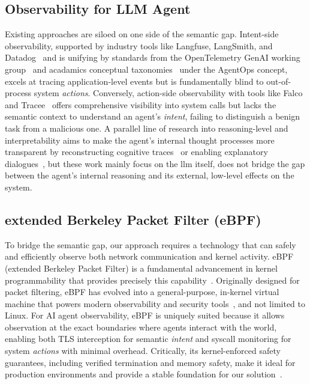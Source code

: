 \subsection{Observability for LLM Agent}

Existing approaches are siloed on one side of the semantic gap. Intent-side observability, supported by industry tools like Langfuse, LangSmith, and Datadog~\cite{Maierhofer2025Langfuse, langfuse, langsmith, Datadog2023Agents, helicone} and is unifying by standards from the OpenTelemetry GenAI working group~\cite{Liu2025OTel,Bandurchin2025Uptrace} and acadamics conceptual taxonomies~\cite{Dong2024AgentOps, Moshkovich2025Pipeline} under the AgentOps concept, excels at tracing application-level events but is fundamentally blind to out-of-process system \emph{actions}. Conversely, action-side observability with tools like Falco and Tracee~\cite{falco, tracee} offers comprehensive visibility into system calls but lacks the semantic context to understand an agent's \emph{intent}, failing to distinguish a benign task from a malicious one. A parallel line of research into reasoning-level and interpretability aims to make the agent's internal thought processes more transparent by reconstructing cognitive traces~\cite{Rombaut2025Watson} or enabling explanatory dialogues~\cite{Kim2025AgenticInterp}, but these work mainly focus on the llm itself, does not bridge the gap between the agent's internal reasoning and its external, low-level effects on the system.

\subsection{extended Berkeley Packet Filter (eBPF)}

To bridge the semantic gap, our approach requires a technology that can safely and efficiently observe both network communication and kernel activity. eBPF (extended Berkeley Packet Filter) is a fundamental advancement in kernel programmability that provides precisely this capability~\cite{brendangregg}. Originally designed for packet filtering, eBPF has evolved into a general-purpose, in-kernel virtual machine that powers modern observability and security tools~\cite{ebpfio,cilium}, and not limited to Linux\cite{zheng2025extending, windows-ebpf}. For AI agent observability, eBPF is uniquely suited because it allows observation at the exact boundaries where agents interact with the world, enabling both TLS interception for semantic \emph{intent} and syscall monitoring for system \emph{actions} with minimal overhead. Critically, its kernel-enforced safety guarantees, including verified termination and memory safety, make it ideal for production environments and provide a stable foundation for our solution~\cite{kerneldoc}.


